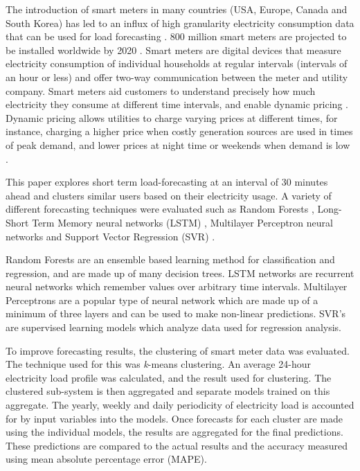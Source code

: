 The introduction of smart meters in many countries (USA, Europe, Canada and South Korea) has led to an influx of high granularity electricity consumption data that can be used for load forecasting \cite{Depuru2011a}. 800 million smart meters are projected to be installed worldwide by 2020 \cite{Telefonica2014}. Smart meters are digital devices that measure electricity consumption of individual households at regular intervals (intervals of an hour or less) and offer two-way communication between the meter and utility company. Smart meters aid customers to understand precisely how much electricity they consume at different time intervals, and enable dynamic pricing \cite{Abreu2012a}. Dynamic pricing allows utilities to charge varying prices at different times, for instance, charging a higher price when costly generation sources are used in times of peak demand, and lower prices at night time or weekends when demand is low \cite{Liu2016,Ito2013}. 

This paper explores short term load-forecasting at an interval of 30 minutes ahead and clusters similar users based on their electricity usage. A variety of different forecasting techniques were evaluated such as Random Forests \cite{TinKamHo}, Long-Short Term Memory neural networks (LSTM) \cite{lstm}, Multilayer Perceptron neural networks \cite{book:984557} and Support Vector Regression (SVR) \cite{Drucker1997}. 

Random Forests are an ensemble based learning method for classification and regression, and are made up of many decision trees. LSTM networks are recurrent neural networks which remember values over arbitrary time intervals. Multilayer Perceptrons are a popular type of neural network which are made up of a minimum of three layers and can be used to make non-linear predictions. SVR's are supervised learning models which analyze data used for regression analysis.

To improve forecasting results, the clustering of smart meter data was evaluated. The technique used for this was \textit{k}-means clustering. An average 24-hour electricity load profile was calculated, and the result used for clustering. The clustered sub-system is then aggregated and separate models trained on this aggregate. The yearly, weekly and daily periodicity of electricity load is accounted for by input variables into the models. Once forecasts for each cluster are made using the individual models, the results are aggregated for the final predictions. These predictions are compared to the actual results and the accuracy measured using mean absolute percentage error (MAPE).

